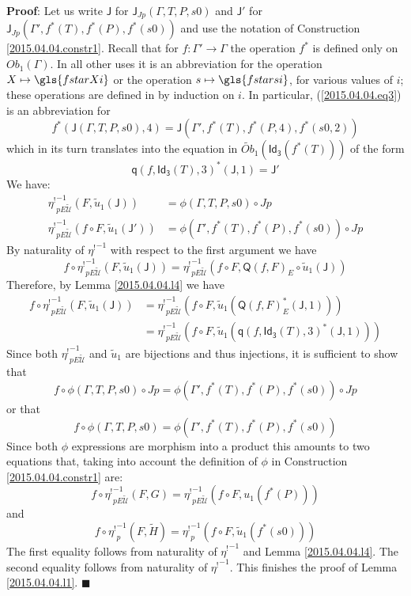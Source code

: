 \documentclass[12pt]{article}
\numberwithin{equation}{section}
\newenvironment{myproof}{{\bf Proof}:}{$\blacksquare$ \vskip 5mm }
\newcommand{\sr}{\rightarrow}
\newcommand{\wt}{\widetilde}
\newcommand{\q}{\mathsf{q}}
\newcommand{\Idx}{\mathsf{Id_3}} %
\newcommand{\J}{\mathsf{J}}
\newcommand{\U}{\mathcal{U}}
\newcommand{\Q}{\mathsf{Q}}
\newcommand{\etashriek}{\eta^!}
\newcommand{\etaunshriek}{{\etashriek}^{-1}}
\newcommand{\Obwt}{\wt{Ob}}
\begin{document}
\begin{myproof}
Let us write $\J$ for $\J_{Jp}(\Gamma,T,P,s0)$ and $\J'$ for
$\J_{Jp}(\Gamma',f^*(T),f^*(P),f^*(s0))$ and use the notation of Construction
\ref{2015.04.04.constr1}. Recall that for $f:\Gamma'\sr \Gamma$ the operation
$f^*$ is defined only on $Ob_1(\Gamma)$. In all other uses it is an
abbreviation for the operation $X\mapsto \gls{fstarXi}$ or the operation $s\mapsto \gls{fstarsi}$,
for various values of $i$; these operations are defined in \cite[\S 3]{Csubsystems} by induction on $i$.
In particular, (\ref{2015.04.04.eq3}) is an abbreviation for
%
$$f^*(\J(\Gamma,T,P,s0),4)=\J(\Gamma',f^*(T),f^*(P,4),f^*(s0,2))$$
%
which in its turn translates into the equation in $\Obwt_1(\Idx(f^*(T)))$ of
the form
%
$$\q(f,\Idx(T),3)^*(\J,1)=\J'$$
%
We have:
%
\begin{align*}
  \etaunshriek_{pE\wt{\U}}(F,\wt{u}_1(\J))&=\phi(\Gamma,T,P,s0)\circ Jp \\
  \etaunshriek_{pE\wt{\U}}(f\circ F, \wt{u}_1(\J'))&=\phi(\Gamma',f^*(T),f^*(P),f^*(s0))\circ Jp
\end{align*}
%
By naturality of $\etaunshriek$ with respect to the first argument we have
%
$$f\circ \etaunshriek_{pE\wt{\U}}(F,\wt{u}_1(\J))=\etaunshriek_{pE\wt{\U}}(f\circ F,
\Q(f,F)_{E}\circ \wt{u}_1(\J))$$
%
Therefore, by Lemma \ref{2015.04.04.l4} we have
%
\begin{align*}
  f\circ \etaunshriek_{pE\wt{\U}}(F,\wt{u}_1(\J))
    & = \etaunshriek_{pE\wt{\U}}(f\circ F, \wt{u}_1(\Q(f,F)_{E}^*(\J,1))) \\
    & = \etaunshriek_{pE\wt{\U}}(f\circ F, \wt{u}_1(\q(f,\Idx(T),3)^*(\J,1)))
\end{align*}
%
Since both $\etaunshriek_{pE\wt{\U}}$ and $\wt{u}_1$ are bijections and thus
injections, it is sufficient to show that
%
$$f\circ \phi(\Gamma,T,P,s0)\circ Jp = \phi(\Gamma',f^*(T),f^*(P),f^*(s0))\circ
Jp$$
%
or that
%
$$f\circ \phi(\Gamma,T,P,s0)=\phi(\Gamma',f^*(T),f^*(P),f^*(s0))$$
%
Since both $\phi$ expressions are morphism into a product this amounts to two
equations that, taking into account the definition of $\phi$ in Construction
\ref{2015.04.04.constr1} are:
%
$$f\circ \etaunshriek_{pE\wt{\U}}(F,G)=\etaunshriek_{pE\wt{\U}}(f\circ F, u_1(f^*(P)))$$
%
and
%
$$f\circ \etaunshriek_p(F,\wt{H})=\etaunshriek_p(f\circ F, \wt{u}_1(f^*(s0)))$$
%
The first equality follows from naturality of $\etaunshriek$ and Lemma
\ref{2015.04.04.l4}. The second equality follows from naturality of
$\etaunshriek$. This finishes the proof of Lemma \ref{2015.04.04.l1}.
\end{myproof}
\end{document}
